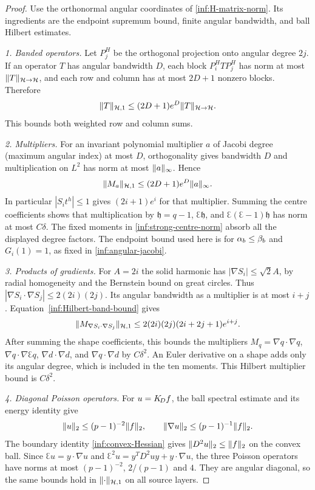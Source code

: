 \begin{proof}
Use the orthonormal angular coordinates of \eqref{inf:H-matrix-norm}.
Its ingredients are the endpoint supremum bound, finite angular
bandwidth, and ball Hilbert estimates.

\emph{1. Banded operators.}
Let $P_j^H$ be the orthogonal projection onto angular degree
$2j$. If an operator $T$ has angular bandwidth $D$, each block
$P_i^HTP_j^H$ has norm at most $\lVert T\rVert_{\mathcal{H}\to\mathcal{H}}$, and each
row and column has at most $2D+1$ nonzero blocks. Therefore
\begin{equation}\label{inf:Hilbert-band-bound}
 \lVert T\rVert_{\mathcal{H},1}\le(2D+1)e^D\lVert T\rVert_{\mathcal{H}\to\mathcal{H}}.
\end{equation}
This bounds both weighted row and column sums.

\emph{2. Multipliers.}
For an invariant polynomial multiplier $a$ of Jacobi degree
(maximum angular index) at most $D$, orthogonality gives bandwidth $D$ and multiplication
on $L^2$ has norm at most $\lVert a\rVert_\infty$. Hence
\[
 \lVert M_a\rVert_{\mathcal{H},1}\le(2D+1)e^D\lVert a\rVert_\infty.
\]
In particular $|S_it^h|\le1$ gives
$(2i+1)e^i$ for that multiplier. Summing the centre coefficients
shows that multiplication by $\mathfrak h=q-1$, $\Euler\mathfrak h$,
and $\Euler(\Euler-1)\mathfrak h$ has norm at most $C\delta$.
The fixed moments in \eqref{inf:strong-centre-norm} absorb all
the displayed degree factors. The endpoint bound used here is
for $\alpha_b\le\beta_b$ and $G_i(1)=1$, as fixed in
\eqref{inf:angular-jacobi}.

\emph{3. Products of gradients.}
For $A=2i$ the solid harmonic has
$|\nabla S_i|\le\sqrt2A$, by radial homogeneity and the
Bernstein bound on great circles. Thus
$|\nabla S_i\cdot\nabla S_j|\le2(2i)(2j)$.
Its angular bandwidth as a multiplier is at most $i+j$.
Equation~\eqref{inf:Hilbert-band-bound} gives
\begin{equation}\label{inf:Hilbert-gradient-product}
 \lVert M_{\nabla S_i\cdot\nabla S_j}\rVert_{\mathcal{H},1}
 \le2(2i)(2j)(2i+2j+1)e^{i+j}.
\end{equation}
After summing the shape coefficients, this bounds the multipliers
$M_q=\nabla q\cdot\nabla q$,
$\nabla q\cdot\nabla\Euler q$,
$\nabla d\cdot\nabla d$, and
$\nabla q\cdot\nabla d$ by $C\delta^2$.
An Euler derivative on a shape adds only its angular degree,
which is included in the ten moments. This Hilbert multiplier
bound is $C\delta^2$.

\emph{4. Diagonal Poisson operators.}
For $u=K_{\!D} f$, the ball spectral estimate and its energy identity
give
\[
 \lVert u\rVert_2\le(p-1)^{-2}\lVert f\rVert_2,\qquad
 \lVert \nabla u\rVert_2\le(p-1)^{-1}\lVert f\rVert_2.
\]
The boundary identity \eqref{inf:convex-Hessian} gives
$\lVert D^2u\rVert_2\le\lVert f\rVert_2$ on the convex ball.
Since $\Euler u=y\cdot\nabla u$ and
$\Euler^2u=y^TD^2uy+y\cdot\nabla u$, the three Poisson operators
have norms at most $(p-1)^{-2}$, $2/(p-1)$ and $4$.
They are angular diagonal, so the same bounds hold in
$\lVert \cdot\rVert_{\mathcal{H},1}$ on all source layers.


\end{proof}
